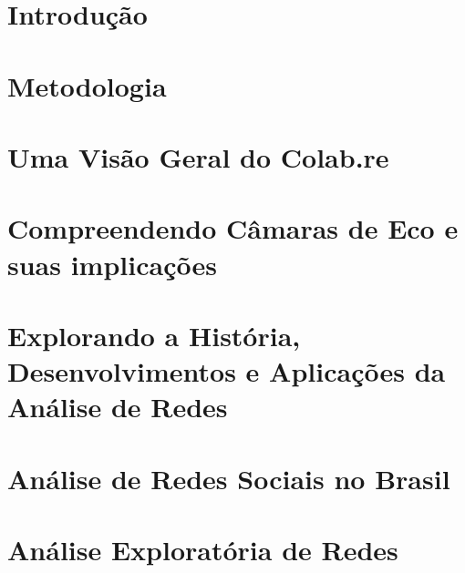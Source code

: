 \documentclass[mestrado, pre-defesa]{packages/icmc}
\begin{document}
\textual

\chapter{Introdução}
\label{chapter:01_introducao}


%

\chapter{Metodologia}
\label{chapter:03_metodologia}


\chapter{Uma Visão Geral do Colab.re}
\label{chapter:04_colab}


\chapter{Compreendendo Câmaras de Eco e suas implicações}
\label{chapter:05_echochambers}


\chapter{Explorando a História, Desenvolvimentos e Aplicações da Análise de Redes}
\label{chapter:06_networkanalysis}


\chapter{Análise de Redes Sociais no Brasil}
\label{chapter:07_networkbr}


\chapter{Análise Exploratória de Redes}
\label{chapter:08_exploratory}



% 
\end{document}
